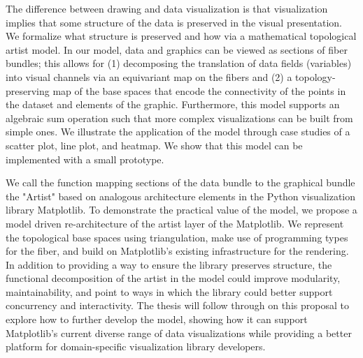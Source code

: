 The difference between drawing and data visualization is that visualization implies that some structure of the data is preserved in the visual presentation. We formalize what structure is preserved and how via a mathematical topological artist model. In our model, data and graphics can be viewed as sections of fiber bundles; this allows for (1) decomposing the translation of data fields (variables) into visual channels via an equivariant map on the fibers and (2) a topology-preserving map of the base spaces that encode the connectivity of the points in the dataset and elements of the graphic. Furthermore, this model supports an algebraic sum operation such that more complex visualizations can be built from simple ones. We illustrate the application of the model through case studies of a scatter plot, line plot, and heatmap. We show that this model can be implemented with a small prototype.

We call the function mapping sections of the data bundle to the graphical bundle the "Artist" based on analogous architecture elements in the Python visualization library Matplotlib. To demonstrate the practical value of the model, we propose a model driven re-architecture of the artist layer of the Matplotlib. We represent the topological base spaces using triangulation, make use of programming types for the fiber, and build on Matplotlib's existing infrastructure for the rendering. In addition to providing a way to ensure the library preserves structure, the functional decomposition of the artist in the model could improve modularity, maintainability, and point to ways in which the library could better support concurrency and interactivity. The thesis will follow through on this proposal to explore how to further develop the model, showing how it can support Matplotlib's current diverse range of data visualizations while providing a better platform for domain-specific visualization library developers.

